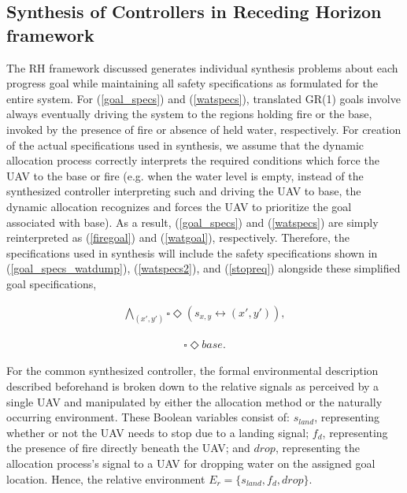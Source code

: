 \documentclass{ieeeaccess}
\newcommand{\always}{\square}
\newcommand{\eventually}{\Diamond}
\begin{document}
\subsection{Synthesis of Controllers in Receding Horizon framework}
The RH framework discussed generates individual synthesis problems about each progress goal while maintaining all safety specifications as formulated for the entire system. For (\ref{goal_specs}) and (\ref{watspecs}), translated GR(1) goals involve always eventually driving the system to the regions holding fire or the base, invoked by the presence of fire or absence of held water, respectively. For creation of the actual specifications used in synthesis, we assume that the dynamic allocation process correctly interprets the required conditions which force the UAV to the base or fire (e.g. when the water level is empty, instead of the synthesized controller interpreting such and driving the UAV to base, the dynamic allocation recognizes and forces the UAV to prioritize the goal associated with base). As a result, (\ref{goal_specs}) and (\ref{watspecs}) are simply reinterpreted as (\ref{firegoal}) and (\ref{watgoal}), respectively. Therefore, the specifications used in synthesis will include the safety specifications shown in (\ref{goal_specs_watdump}), (\ref{watspecs2}), and (\ref{stopreq}) alongside these simplified goal specifications,

\begin{equation}
\begin{aligned}
\bigwedge_{(x',y')} \always \eventually (s_{x,y} \leftrightarrow (x', y')),
\end{aligned}
\label{firegoal}
\end{equation}

\begin{equation}
\begin{aligned}
\always \eventually base.
\end{aligned}
\label{watgoal}
\end{equation}

For the common synthesized controller, the formal environmental description described beforehand is broken down to the relative signals as perceived by a single UAV and manipulated by either the allocation method or the naturally occurring environment. These Boolean variables consist of: $s_{land}$, representing whether or not the UAV needs to stop due to a landing signal; $f_d$, representing the presence of fire directly beneath the UAV; and $drop$, representing the allocation process's signal to a UAV for dropping water on the assigned goal location. Hence, the relative environment $E_r = \{s_{land}, f_d, drop\}$. 
\end{document}
